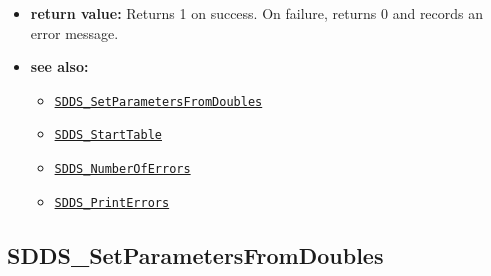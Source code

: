 \documentclass[11pt]{article}
\newcommand{\progref}[1]{\hyperref[SDDS_#1]{\tt SDDS\_#1}}
\begin{document}
\begin{itemize}
\begin{itemize}
Note that for data of type SDDS\_STRING, pass-by-value means passing an item of type char *, while pass by reference means passing an item of type char **.
\end{itemize}
\item {\bf return value:}\newline
Returns 1 on success. On failure, returns 0 and records an error message.
\item {\bf see also:}
\begin{itemize}
\item \progref{SetParametersFromDoubles}
\item \progref{StartTable}
\item \progref{NumberOfErrors}
\item \progref{PrintErrors}
\end{itemize}
\end{itemize}

\subsection{SDDS\_SetParametersFromDoubles}
\label{SDDS_SetParametersFromDoubles}
\end{document}
